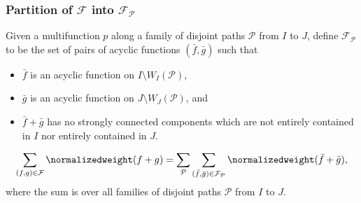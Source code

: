 \subsubsection{Partition of \texorpdfstring{\(\mathcal{F}\)}{F} into \texorpdfstring{\(\mathcal{F}_{\mathcal{P}}\)}{FP}}

Given a multifunction \(p\) along a family of disjoint paths \(\mathcal{P}\) from \(I\) to \(J\),
define \(\mathcal{F}_{\mathcal{P}}\) to be the set of pairs of acyclic functions \((\bar{f}, \bar{g})\) such that
\begin{itemize}
    \item \(\bar{f}\) is an acyclic function on \(I \setminus W_I(\mathcal{P})\),
    \item \(\bar{g}\) is an acyclic function on \(J \setminus W_J(\mathcal{P})\), and
    \item \(\bar{f} + \bar{g}\) has no strongly connected components which are not entirely contained in \(I\) nor entirely contained in \(J\).
\end{itemize}

\begin{lemm} \label{lemma:partition-f-fp}
    \begin{equation*}
        \sum_{(f,g)\in\mathcal{F}} \normalizedweight(f+g)
        = \sum_{\mathcal{P}} \sum_{(\bar{f}, \bar{g}) \in \mathcal{F}_{\mathcal{P}}}\normalizedweight(\bar{f} + \bar{g}),
    \end{equation*}
    where the sum is over all families of disjoint paths \(\mathcal{P}\) from \(I\) to \(J\).
\end{lemm}

